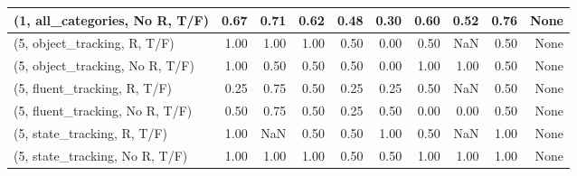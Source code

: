 \begin{table*}[h!]
\begin{adjustbox}{width=2\columnwidth,center}
\begin{tabular}{lrrr|rrr|rrr}
(1, all\_categories, No R, T/F)       &                      0.67 &                  0.71 &                      0.62 &                          0.48 &                      0.30 &                          0.60 &                                   0.52 &                               0.76 &                                  None \\



\midrule
(5, object\_tracking, R, T/F)         &                      1.00 &                  1.00 &                      1.00 &                          0.50 &                      0.00 &                          0.50 &                                    NaN &                               0.50 &                                  None \\
(5, object\_tracking, No R, T/F)      &                      1.00 &                  0.50 &                      0.50 &                          0.50 &                      0.00 &                          1.00 &                                   1.00 &                               0.50 &                                  None \\
(5, fluent\_tracking, R, T/F)         &                      0.25 &                  0.75 &                      0.50 &                          0.25 &                      0.25 &                          0.50 &                                    NaN &                               0.50 &                                  None \\
(5, fluent\_tracking, No R, T/F)      &                      0.50 &                  0.75 &                      0.50 &                          0.25 &                      0.50 &                          0.00 &                                   0.00 &                               0.50 &                                  None \\
(5, state\_tracking, R, T/F)          &                      1.00 &                   NaN &                      0.50 &                          0.50 &                      1.00 &                          0.50 &                                    NaN &                               1.00 &                                  None \\
(5, state\_tracking, No R, T/F)       &                      1.00 &                  1.00 &                      1.00 &                          0.50 &                      0.50 &                          1.00 &                                   1.00 &                               1.00 &                                  None \\

\end{tabular}
\end{adjustbox}
\end{table*}
